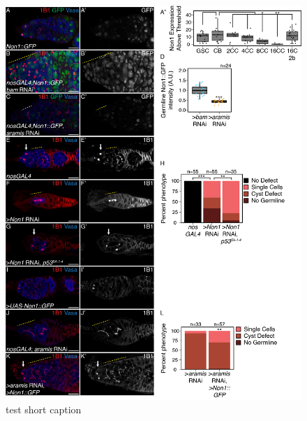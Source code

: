 \documentclass[12pt,oneside]{reedthesis}
\begin{document}
\begin{figure}

{\centering \includegraphics[width=6.5 in,height=8.9375 in]{./figure/Ribosome Biogenesis/Ribosome Biogenesis 5} 

}

\caption[test short caption]{test short caption}\label{fig:unnamed-chunk-14}
\end{figure}
\end{document}
